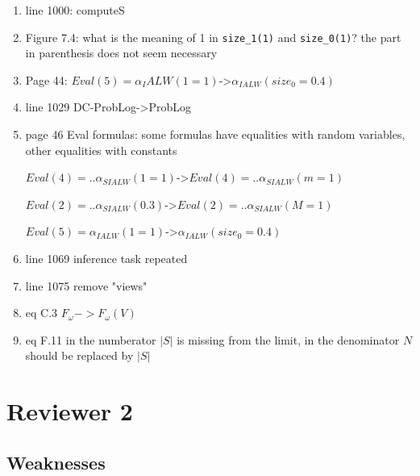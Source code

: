 \begin{enumerate}
    \item line 1000: computeS
    \\
    \item Figure 7.4: what is the meaning of 1 in \texttt{size\_1(1)} and \texttt{size\_0(1)}? the part in parenthesis does not seem necessary
    \\
    \item Page 44:
    $Eval(5)=\alpha_IALW(1=1)$->$\alpha_{IALW}(size_0=0.4)$
    \\
    \item line 1029 DC-ProbLog->ProbLog
    \\
    \item page 46 Eval formulas: some formulas have equalities with random variables, other equalities with constants
     
    $Eval(4)=..\alpha_{SIALW}(1=1)$->$Eval(4)=..\alpha_{SIALW}(m=1)$
     

     $Eval(2)=..\alpha_{SIALW}(0.3)$->$Eval(2)=..\alpha_{SIALW}(M=1)$
     
     $Eval(5)=\alpha_{IALW}(1=1)$->$\alpha_{IALW}(size_0=0.4)$
     \\
     \item line 1069 inference task repeated
     \\
    \item line 1075 remove "views"
    \\
    \item eq C.3 $F_\omega->F_\omega(V)$
    \\
    \item eq F.11 in the numberator $|S|$ is missing from the limit, in the denominator $N$ should be replaced by $|S|$
    \\
\end{enumerate}

\section{Reviewer 2}





\subsection{Weaknesses}

